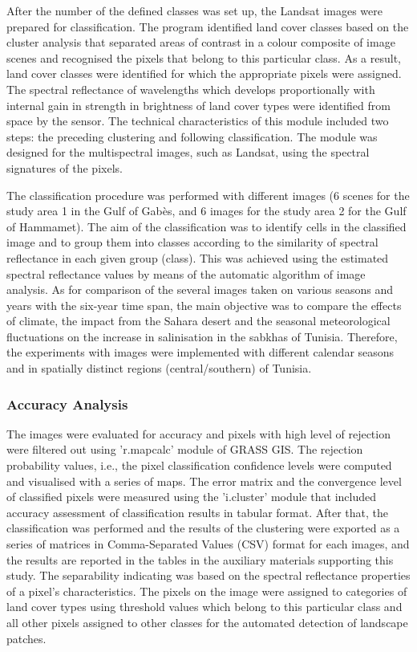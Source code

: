 \documentclass[land,article,accept,pdftex,moreauthors]{Definitions/mdpi}
\begin{document}
{After the number of the defined classes was set up, the Landsat images were prepared for classification. The program identified land cover classes based on the cluster analysis that separated areas of contrast in a colour composite of image scenes and recognised the pixels that belong to this particular class. As a result, land cover classes were identified for which the appropriate pixels were assigned. }The spectral reflectance of wavelengths which develops proportionally with internal gain in strength in brightness of land cover types were identified from space by the sensor. The technical characteristics of this module included two steps: the preceding clustering and following classification. The module was designed {for} the multispectral images, such as Landsat, using the spectral signatures of the pixels. 

The classification procedure was performed with different images (6 scenes for the study area {1} in the Gulf of Gabès, and 6 images for the study area {2} for the Gulf of Hammamet). The aim of the classification {was }to identify cells in the classified image and to group {them} into classes according to the similarity of spectral reflectance in each given group (class){. This was achieved using the }estimated spectral reflectance {values by means of the } automatic {algorithm of }image analysis{. }As for comparison of {the }several images taken on various seasons and{ }years with {the six}-year {time span}, the main {objective} was to compare the effects of climate, the impact from the Sahara {desert }and the seasonal meteorological fluctuations on the {increase} in salinisation in the sabkhas of Tunisia{. }Therefore, the experiments with images were implemented with different calendar seasons and in {spatially distinct} regions (central/southern) of Tunisia. 


 \subsubsection{Accuracy Analysis}

The images were evaluated for accuracy and pixels with high level of rejection were filtered out using 'r.mapcalc' module of GRASS GIS. The rejection probability values, i.e., the pixel classification confidence levels were computed and visualised with a series of maps. The error matrix and {the }convergence level of classified pixels were measured using {the }'i.cluster' module that included accuracy assessment of classification results in tabular format. After that, the classification was performed {and} the results of the clustering were exported as a series of matrices in Comma-Separated Values (CSV) format for each images, and the results are reported in the tables in the {auxiliary materials supporting }this study. {The separability indicating was based on the spectral reflectance properties of a pixel's characteristics. The pixels on the image were assigned to categories of land cover types using threshold values which belong to this particular class and all other pixels assigned to other classes for the automated detection of landscape patches. }
\end{document}
